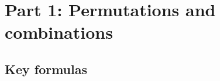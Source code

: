 
\maketitle

\tableofcontents
\clearpage

\section{Part 1: Permutations and combinations}

\subsection*{Key formulas}

